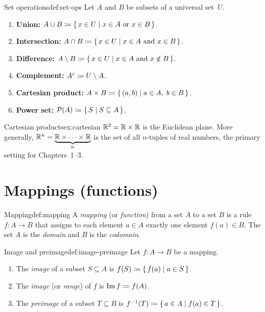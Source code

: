 \begin{definition}{Set operations}{def:set-ops}
Let $A$ and $B$ be subsets of a universal set~$U$.
\begin{enumerate}[label=(\roman*)]
  \item \textbf{Union:} $A\cup B \coloneqq \left\{\,x\in U\;\middle|\;x\in A \text{ or } x\in B\,\right\}$.
  \item \textbf{Intersection:} $A\cap B \coloneqq \left\{\,x\in U\;\middle|\;x\in A \text{ and } x\in B\,\right\}$.
  \item \textbf{Difference:} $A\setminus B \coloneqq \left\{\,x\in U\;\middle|\;x\in A \text{ and } x\notin B\,\right\}$.
  \item \textbf{Complement:} $A^c \coloneqq U\setminus A$.
  \item \textbf{Cartesian product:} $A\times B \coloneqq \left\{\,(a,b)\;\middle|\;a\in A,\; b\in B\,\right\}$.
  \item \textbf{Power set:} $\mathcal{P}(A) \coloneqq \left\{\,S\;\middle|\;S\subseteq A\,\right\}$.
\end{enumerate}
\end{definition}

\begin{example}{Cartesian products}{ex:cartesian}
${\mathbb{R}}^2 = {\mathbb{R}}\times{\mathbb{R}}$ is the Euclidean plane. More generally,
${\mathbb{R}}^n = \underbrace{{\mathbb{R}}\times\cdots\times{\mathbb{R}}}_{n}$ is the set of all
$n$-tuples of real numbers, the primary setting for Chapters~1--3.
\end{example}


\section{Mappings (functions)}\label{sec:mappings}

\begin{definition}{Mapping}{def:mapping}
A \emph{mapping} (or \emph{function}) from a set $A$ to a
set $B$ is a rule $f\colon A\to B$ that assigns to each element $a\in A$
exactly one element $f(a)\in B$. The set $A$ is the \emph{domain} and $B$
is the \emph{codomain}.
\end{definition}

\begin{definition}{Image and preimage}{def:image-preimage}
Let $f\colon A\to B$ be a mapping.
\begin{enumerate}[label=(\roman*)]
  \item The \emph{image} of a subset $S\subseteq A$ is
    $f(S) \coloneqq \left\{\,f(a)\;\middle|\;a\in S\,\right\}$.
  \item The \emph{image} (or \emph{range}) of $f$ is $\operatorname{Im} f \coloneqq f(A)$.
  \item The \emph{preimage} of a subset $T\subseteq B$ is
    $f^{-1}(T) \coloneqq \left\{\,a\in A\;\middle|\;f(a)\in T\,\right\}$.
\end{enumerate}
\end{definition}

